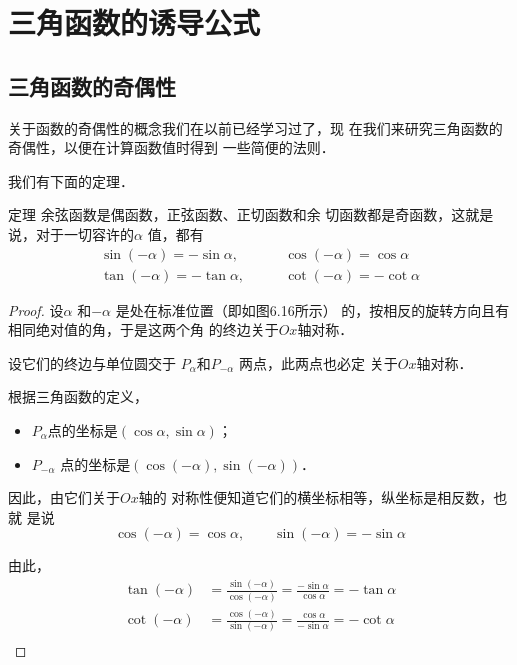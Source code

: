 \section{三角函数的诱导公式}
\subsection{三角函数的奇偶性}
关于函数的奇偶性的概念我们在以前已经学习过了，现
在我们来研究三角函数的奇偶性，以便在计算函数值时得到
一些简便的法则．

我们有下面的定理．
\begin{blk}{定理}
    余弦函数是偶函数，正弦函数、正切函数和余
    切函数都是奇函数，这就是说，对于一切容许的$\alpha$ 值，都有
  \begin{equation}
 \begin{split}
        \sin(-\alpha )=-\sin\alpha,&\qquad \cos(-\alpha )=\cos\alpha\\
          \tan(-\alpha )=-\tan\alpha,&\qquad  \cot(-\alpha )=-\cot\alpha
    \end{split}     
  \end{equation}  
\end{blk}

\begin{proof}
设$\alpha$ 和$-\alpha$ 是处在标准位置（即如图6.16所示）
的，按相反的旋转方向且有相同绝对值的角，于是这两个角
的终边关于$Ox$轴对称．

\begin{figure}[htp]
    \centering
{}
    \caption{}
\end{figure}


设它们的终边与单位圆交于
$P_{\alpha}$和$P_{-\alpha}$ 两点，此两点也必定
关于$Ox$轴对称．

根据三角函数的定义，
\begin{itemize}
    \item $P_{\alpha}$点的坐标是$(\cos\alpha ,\sin\alpha)$；
    \item $P_{-\alpha}$
点的坐标是$(\cos(-\alpha ),\sin(-\alpha ))$．
\end{itemize}

因此，由它们关于$Ox$轴的
对称性便知道它们的横坐标相等，纵坐标是相反数，也就
是说
\[\cos(-\alpha )=\cos\alpha ,\qquad \sin(-\alpha )= -\sin\alpha\]

由此，
\[\begin{split}
    \tan(-\alpha)&=\frac{\sin(-\alpha)}{\cos(-\alpha)}=\frac{-\sin\alpha}{\cos\alpha}=-\tan\alpha\\
    \cot(-\alpha)&=\frac{\cos(-\alpha)}{\sin(-\alpha)}=\frac{\cos\alpha}{-\sin\alpha}=-\cot\alpha\\
\end{split}\]
\end{proof}

